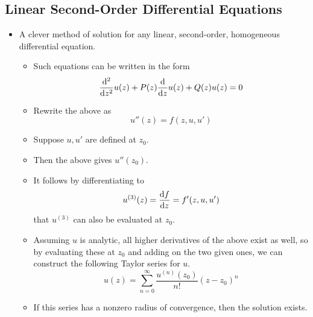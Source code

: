 \documentclass[../finalProject.tex]{subfiles}
\begin{document}
\subsection{Linear Second-Order Differential Equations}
\begin{itemize}
    \item A clever method of solution for any linear, second-order, homogeneous differential equation.
    \begin{itemize}
        \item Such equations can be written in the form
        \begin{equation*}
            \dv[2]{z}u(z)+P(z)\dv{z}u(z)+Q(z)u(z) = 0
        \end{equation*}
        \item Rewrite the above as
        \begin{equation*}
            u''(z) = f(z,u,u')
        \end{equation*}
        \item Suppose $u,u'$ are defined at $z_0$.
        \item Then the above gives $u''(z_0)$.
        \item It follows by differentiating to
        \begin{equation*}
            u^{(3)}(z) = \dv{f}{z}
            = f'(z,u,u')
        \end{equation*}
        that $u^{(3)}$ can also be evaluated at $z_0$.
        \item Assuming $u$ is analytic, all higher derivatives of the above exist as well, so by evaluating these at $z_0$ and adding on the two given ones, we can construct the following Taylor series for $u$.
        \begin{equation*}
            u(z) = \sum_{n=0}^\infty\frac{u^{(n)}(z_0)}{n!}(z-z_0)^n
        \end{equation*}
        \item If this series has a nonzero radius of convergence, then the solution exists.
    \end{itemize}
\end{itemize}
\end{document}
